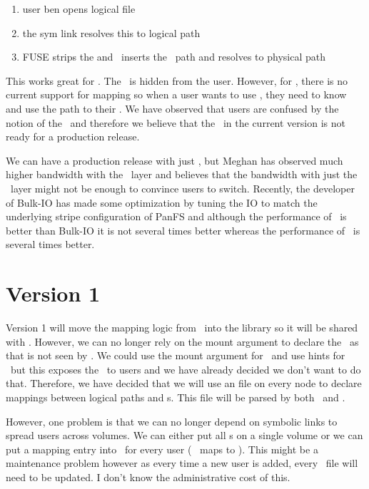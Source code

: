 \documentclass[10pt]{article}
\begin{document}
\begin{enumerate}
\item{user ben opens logical file }
\item{the sym link resolves this to logical path 
        }
\item{FUSE strips the  and \plfs\ inserts the \store\ path and resolves to physical path }
\end{enumerate}

This works great for \fuse.  The \store\ is hidden from the user.  However, for
\adio, there is no current support for mapping so when a user wants to use
\adio, they need to know and use the path to their \store.  We have observed
that users are confused by the notion of the \store\ and therefore we believe
that the \adio\ in the current version is not ready for a production release. 

We can have a production release with just \fuse, but Meghan has observed much
higher bandwidth with the \adio\ layer and believes that the bandwidth with 
just the \fuse\ layer might not be enough to convince users to switch.  
Recently, the developer of Bulk-IO has made some optimization by tuning the
IO to match the underlying stripe configuration of PanFS and although the
performance of \fuse\ is better than Bulk-IO it is not several times better
whereas the performance of \adio\ is several times better.

\section{Version 1}

Version 1 will move the mapping logic from \fuse\ into the library so it will
be shared with \adio.  However, we can no longer rely on the mount argument to
declare the \store\ as that is not seen by \adio.  We could use the mount
argument for \fuse\ and use hints for \adio\ but this exposes the \store\ to
users and we have already decided we don't want to do that.  Therefore, we have
decided that we will use an  file on every node to declare
mappings between logical paths and {\store}s.  This file will be parsed by both
\fuse\ and \adio.

However, one problem is that we can no longer depend on symbolic links to
spread users across volumes.  We can either put all {\store}s on a single
volume or we can put a mapping entry into \plfsrc\ for every user
(\eg\  maps to ).
This might be a maintenance problem however as every time a new user is
added, every \plfsrc\ file will need to be updated.  I don't know
the administrative cost of this.
\end{document}
